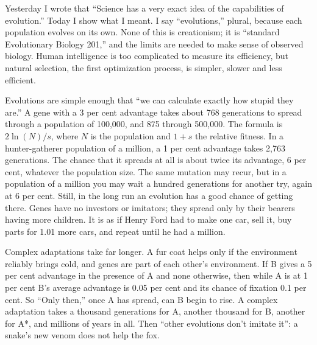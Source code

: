 
Yesterday I wrote that ``Science has a very exact idea of the capabilities of evolution.'' Today I show what I meant. I say ``evolutions,'' plural, because each population evolves on its own. None of this is creationism; it is ``standard Evolutionary Biology 201,'' and the limits are needed to make sense of observed biology. Human intelligence is too complicated to measure its efficiency, but natural selection, the first optimization process, is simpler, slower and less efficient.

Evolutions are simple enough that ``we can calculate exactly how stupid they are.'' A gene with a 3 per cent advantage takes about 768 generations to spread through a population of 100,000, and 875 through 500,000. The formula is $2\ln(N)/s$, where $N$ is the population and $1+s$ the relative fitness. In a hunter-gatherer population of a million, a 1 per cent advantage takes 2,763 generations. The chance that it spreads at all is about twice its advantage, 6 per cent, whatever the population size. The same mutation may recur, but in a population of a million you may wait a hundred generations for another try, again at 6 per cent. Still, in the long run an evolution has a good chance of getting there.  Genes have no investors or imitators; they spread only by their bearers having more children. It is as if Henry Ford had to make one car, sell it, buy parts for 1.01 more cars, and repeat until he had a million.

Complex adaptations take far longer. A fur coat helps only if the environment reliably brings cold, and genes are part of each other's environment. If B gives a 5 per cent advantage in the presence of A and none otherwise, then while A is at 1 per cent B's average advantage is 0.05 per cent and its chance of fixation 0.1 per cent. So ``Only then,'' once A has spread, can B begin to rise.  A complex adaptation takes a thousand generations for A, another thousand for B, another for A*, and millions of years in all. Then ``other evolutions don't imitate it'': a snake's new venom does not help the fox. 


